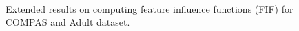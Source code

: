 \begin{figure}
\begin{center}
		\\
		
	
		
	\end{center}
	\caption[FIF illustration using {\fvgm}]{Extended results on computing feature influence functions (FIF) for COMPAS  and Adult dataset.}\label{fairness_fvgm_fig:fif}
\end{figure}


